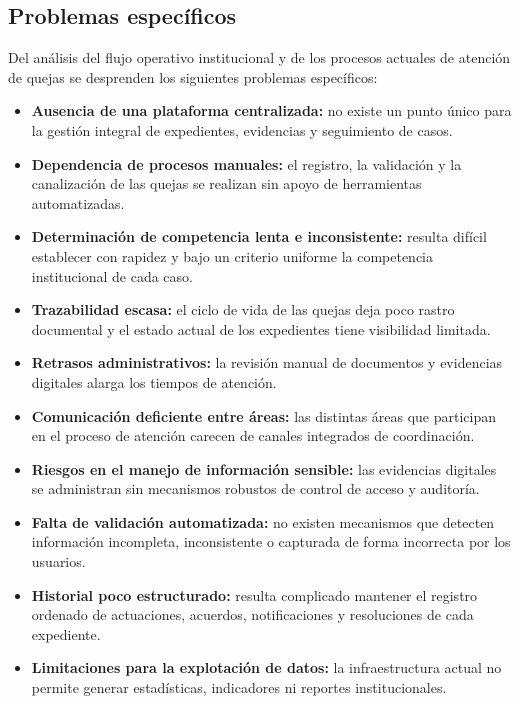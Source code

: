 	\subsection{Problemas específicos}
	Del análisis del flujo operativo institucional y de los procesos actuales de atención de quejas se
	desprenden los siguientes problemas específicos:
	
	\begin{itemize}
		\item \textbf{Ausencia de una plataforma centralizada:} no existe un punto único para la gestión
		integral de expedientes, evidencias y seguimiento de casos.
	
		\item \textbf{Dependencia de procesos manuales:} el registro, la validación y la canalización de
		las quejas se realizan sin apoyo de herramientas automatizadas.
	
		\item \textbf{Determinación de competencia lenta e inconsistente:} resulta difícil establecer con
		rapidez y bajo un criterio uniforme la competencia institucional de cada caso.
	
		\item \textbf{Trazabilidad escasa:} el ciclo de vida de las quejas deja poco rastro documental y el
		estado actual de los expedientes tiene visibilidad limitada.
	
		\item \textbf{Retrasos administrativos:} la revisión manual de documentos y evidencias digitales
		alarga los tiempos de atención.
	
		\item \textbf{Comunicación deficiente entre áreas:} las distintas áreas que participan en el
		proceso de atención carecen de canales integrados de coordinación.
	
		\item \textbf{Riesgos en el manejo de información sensible:} las evidencias digitales se
		administran sin mecanismos robustos de control de acceso y auditoría.
	
		\item \textbf{Falta de validación automatizada:} no existen mecanismos que detecten información
		incompleta, inconsistente o capturada de forma incorrecta por los usuarios.
	
		\item \textbf{Historial poco estructurado:} resulta complicado mantener el registro ordenado de
		actuaciones, acuerdos, notificaciones y resoluciones de cada expediente.
	
		\item \textbf{Limitaciones para la explotación de datos:} la infraestructura actual no permite
		generar estadísticas, indicadores ni reportes institucionales.
	\end{itemize}
	
